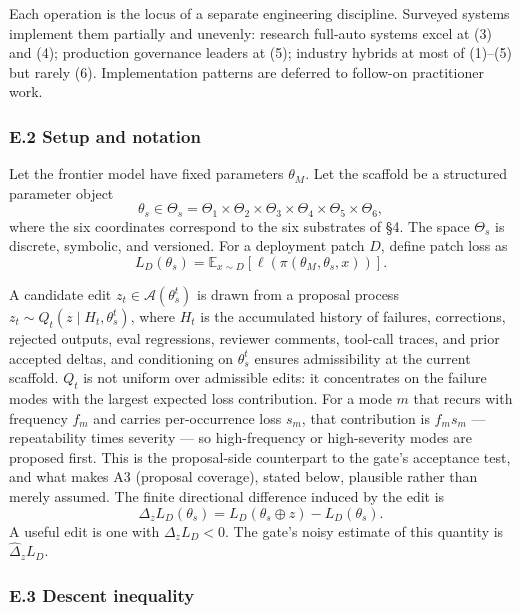 Each operation is the locus of a separate engineering discipline.
Surveyed systems implement them partially and unevenly: research
full-auto systems excel at (3) and (4); production governance leaders at
(5); industry hybrids at most of (1)--(5) but rarely (6). Implementation
patterns are deferred to follow-on practitioner work.

\subsubsection{E.2 Setup and notation}\label{e.2-setup-and-notation}

Let the frontier model have fixed parameters \(\theta_M\). Let the
scaffold be a structured parameter object
\[\theta_s \in \Theta_s = \Theta_1 \times \Theta_2 \times \Theta_3 \times \Theta_4 \times \Theta_5 \times \Theta_6,\]
where the six coordinates correspond to the six substrates of §4. The
space \(\Theta_s\) is discrete, symbolic, and versioned. For a
deployment patch \(D\), define patch loss as
\[L_D(\theta_s) = \mathbb{E}_{x \sim D}\!\left[\ell(\pi(\theta_M, \theta_s, x))\right].\]

A candidate edit \(z_t \in \mathcal{A}(\theta_s^t)\) is drawn from a
proposal process \(z_t \sim Q_t(z \mid H_t, \theta_s^t)\), where \(H_t\)
is the accumulated history of failures, corrections, rejected outputs,
eval regressions, reviewer comments, tool-call traces, and prior
accepted deltas, and conditioning on \(\theta_s^t\) ensures
admissibility at the current scaffold. \(Q_t\) is not uniform over
admissible edits: it concentrates on the failure modes with the largest
expected loss contribution. For a mode \(m\) that recurs with frequency
\(f_m\) and carries per-occurrence loss \(s_m\), that contribution is
\(f_m s_m\) --- repeatability times severity --- so high-frequency or
high-severity modes are proposed first. This is the proposal-side
counterpart to the gate's acceptance test, and what makes A3 (proposal
coverage), stated below, plausible rather than merely assumed. The
finite directional difference induced by the edit is
\[\Delta_z L_D(\theta_s) = L_D(\theta_s \oplus z) - L_D(\theta_s).\] A
useful edit is one with \(\Delta_z L_D < 0\). The gate's noisy estimate
of this quantity is \(\widehat{\Delta}_z L_D\).

\subsubsection{E.3 Descent inequality}\label{e.3-descent-inequality}

